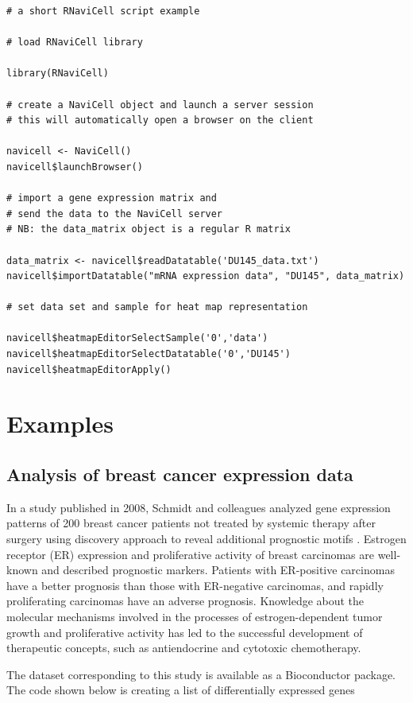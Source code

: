 \documentclass[article]{jss}
\begin{document}
\begin{verbatim}
# a short RNaviCell script example

# load RNaviCell library

library(RNaviCell)

# create a NaviCell object and launch a server session
# this will automatically open a browser on the client 

navicell <- NaviCell()
navicell$launchBrowser()

# import a gene expression matrix and 
# send the data to the NaviCell server
# NB: the data_matrix object is a regular R matrix

data_matrix <- navicell$readDatatable('DU145_data.txt')
navicell$importDatatable("mRNA expression data", "DU145", data_matrix)

# set data set and sample for heat map representation

navicell$heatmapEditorSelectSample('0','data')
navicell$heatmapEditorSelectDatatable('0','DU145')
navicell$heatmapEditorApply()

\end{verbatim}

\section[Examples]{Examples}

\subsection{Analysis of breast cancer expression data}
In a study published in 2008, Schmidt and colleagues analyzed gene expression
patterns of 200 breast cancer patients not treated by systemic therapy after
surgery using discovery approach to reveal additional prognostic motifs
\citep{schmidt2008humoral}. Estrogen receptor (ER) expression and proliferative
activity of breast carcinomas are well-known and described prognostic markers.
Patients with ER-positive carcinomas have a better prognosis than those with
ER-negative carcinomas, and rapidly proliferating carcinomas have an adverse
prognosis. Knowledge about the molecular mechanisms involved in the
processes of estrogen-dependent tumor growth and proliferative activity has led
to the successful development of therapeutic concepts, such as  antiendocrine and
cytotoxic chemotherapy. 

The dataset corresponding to this study is available as a Bioconductor package.
The code shown below is creating a list of differentially expressed genes 
\end{document}
